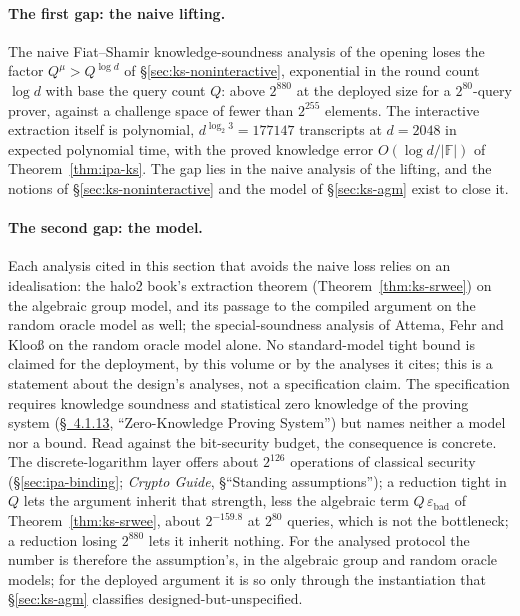 \documentclass[11pt,a4paper]{article}
\theoremstyle{definition}
\newcommand{\F}{\mathbb{F}}
\begin{document}
\paragraph{The first gap: the naive lifting.}
The naive Fiat--Shamir knowledge-soundness analysis of the opening loses the
factor $Q^{\mu} > Q^{\log d}$ of \S\ref{sec:ks-noninteractive}, exponential in
the round count $\log d$ with base the query count $Q$: above $2^{880}$ at the
deployed size for a $2^{80}$-query prover, against a challenge space of fewer
than $2^{255}$ elements. The interactive extraction itself is polynomial,
$d^{\log_2 3} = 177147$ transcripts at $d = 2048$ in expected polynomial time,
with the proved knowledge error $O(\log d/|\F|)$ of Theorem~\ref{thm:ipa-ks}.
The gap lies in the naive analysis of the lifting, and the notions of
\S\ref{sec:ks-noninteractive} and the model of \S\ref{sec:ks-agm} exist to close
it.

\paragraph{The second gap: the model.}
Each analysis cited in this section that avoids the naive loss relies on
an idealisation: the halo2 book's extraction theorem
(Theorem~\ref{thm:ks-srwee}) on the algebraic group model, and its
passage to the compiled argument on the random oracle model as well;
the special-soundness analysis of Attema, Fehr and Kloo\ss{} on the
random oracle model alone. No standard-model tight bound is claimed for the
deployment, by this volume or by the analyses it cites; this is a
statement about the design's analyses, not a specification claim. The
specification requires knowledge soundness and statistical zero knowledge
of the proving system
(\href{https://zips.z.cash/protocol/protocol.pdf\#abstractzk}{\S~4.1.13},
``Zero-Knowledge Proving System'') but names neither a model nor a bound.
Read against the bit-security budget, the consequence is concrete. The
discrete-logarithm layer offers about $2^{126}$ operations of classical
security (\S\ref{sec:ipa-binding}; \emph{Crypto Guide}, \S``Standing
assumptions''); a reduction tight in
$Q$ lets the argument inherit that strength, less the algebraic term
$Q\,\varepsilon_{\mathrm{bad}}$ of Theorem~\ref{thm:ks-srwee}, about
$2^{-159.8}$ at $2^{80}$ queries, which is not the bottleneck; a
reduction losing $2^{880}$ lets it inherit nothing. For the analysed
protocol the number is therefore the assumption's, in the algebraic group
and random oracle models; for the deployed argument it is so only through
the instantiation that \S\ref{sec:ks-agm} classifies
designed-but-unspecified.
\end{document}
